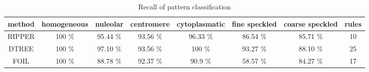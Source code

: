 \begin{table}
	\caption{Recall of pattern classification}
	\label{tab:Recall}
	\tiny
	\centering
	\begin{tabular}{|c|c|c|c|c|c|c|c|}
		\textbf{method} & homogeneous & nuleolar & centromere & cytoplasmatic & fine speckled & coarse speckled & rules \\
		\hline
		\hline
		RIPPER & 100 \% & 95.44 \% & 93.56 \% & 96.33 \% & 86.54 \% & 85.71 \% & 10 \\
		\hline	
		DTREE & 100 \% & 97.10 \% & 93.56 \% & 100 \% & 93.27 \% & 88.10 \% & 25 \\	
		\hline
		FOIL & 100 \% & 88.78 \% & 92.37 \% & 90.9 \% & 58.57 \% & 84.27 \% & 17 \\ 
	\end{tabular}
\end{table}




